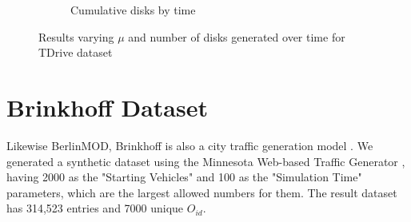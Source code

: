 {\begin{figure}[h!]
\begin{subfigure}[t]{0.48\textwidth}
        \caption{Cumulative disks by time}
        \label{fig:tdrive_disks}
    \end{subfigure}
    \caption{Results varying $\mu$ and number of disks generated over time for TDrive dataset}
    \label{fig:tdrive_results2}
\end{figure}

\section{Brinkhoff Dataset}
\label{sec:brinkhoff}
Likewise BerlinMOD, Brinkhoff is also a city traffic generation model \citep{brinkhoffpaper}. We generated a synthetic
dataset using the Minnesota Web-based Traffic Generator \citep{mntg}, having 2000 as the "Starting Vehicles" and 100 as
the "Simulation Time" parameters, which are the largest allowed numbers for them. The result dataset has 314,523 entries
and 7000 unique $O_{id}$.

}
